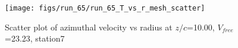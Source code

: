 \begin{figure}[H]
\centering
\texttt{[image: figs/run\_65/run\_65\_T\_vs\_r\_mesh\_scatter]}
\caption{Scatter plot of azimuthal velocity vs radius at $z/c$=10.00, $V_{free}$=23.23, station7}
\label{fig:run_65_T_vs_r_mesh_scatter}
\end{figure}



